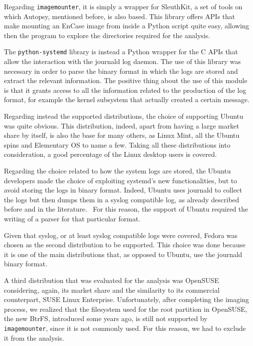 \documentclass[a4paper]{article}
\begin{document}
Regarding \texttt{imagemounter}, it is simply a wrapper for SleuthKit, a set of
tools on which Autopsy, mentioned before, is also based.  This library offers
APIs that make mounting an EnCase image from inside a Python script quite easy,
allowing then the program to explore the directories required for the analysis.

The \texttt{python-systemd} library is instead a Python wrapper for the C APIs
that allow the interaction with the journald log daemon. The use of this library
was necessary in order to parse the binary format in which the logs are stored
and extract the relevant information. The positive thing about the use of this
module is that it grants access to all the information related to the production
of the log format, for example the kernel subsystem that actually created a
certain message.

Regarding instead the supported distributions, the choice of supporting Ubuntu
was quite obvious. This distribution, indeed, apart from having a large market
share by itself, is also the base for many others, as Linux Mint, all the Ubuntu
spins and Elementary OS to name a few. Taking all these distributions into
consideration, a good percentage of the Linux desktop users is covered.

Regarding the choice related to how the system logs are stored, the Ubuntu
developers made the choice of exploiting systemd's new functionalities, but to
avoid storing the logs in binary format. Indeed, Ubuntu uses journald to collect
the logs but then dumps them in a syslog compatible log, as already described
before and in the literature.~\cite{patil2016digital} For this reason, the
support of Ubuntu required the writing of a parser for that particular format.

Given that syslog, or at least syslog compatible logs were covered, Fedora was
chosen as the second distribution to be supported. This choice was done because
it is one of the main distributions that, as opposed to Ubuntu, use the
journald binary format.

A third distribution that was evaluated for the analysis was OpenSUSE
considering, again, its market share and the similarity to its commercial
counterpart, SUSE Linux Enterprise. Unfortunately, after completing the imaging
process, we realized that the filesystem used for the root partition in
OpenSUSE, the new BtrFS, introduced some years ago, is still not supported by
\texttt{imagemounter}, since it is not commonly used. For this reason, we had to
exclude it from the analysis.
\end{document}
